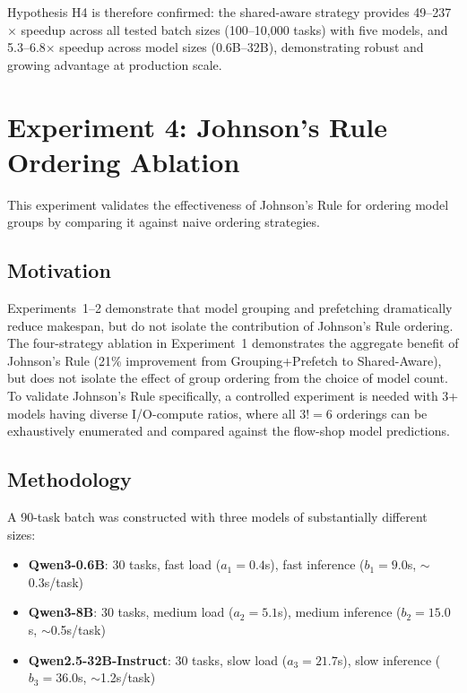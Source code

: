 \documentclass[logo,bsc,singlespacing,parskip,online]{infthesis}
\begin{document}
Hypothesis H4 is therefore confirmed: the shared-aware strategy provides 49--237$\times$ speedup across all tested batch sizes (100--10,000 tasks) with five models, and 5.3--6.8$\times$ speedup across model sizes (0.6B--32B), demonstrating robust and growing advantage at production scale.

\section{Experiment 4: Johnson's Rule Ordering Ablation}

This experiment validates the effectiveness of Johnson's Rule for ordering model groups by comparing it against naive ordering strategies.

\subsection{Motivation}

Experiments~1--2 demonstrate that model grouping and prefetching dramatically reduce makespan, but do not isolate the contribution of Johnson's Rule ordering. The four-strategy ablation in Experiment~1 demonstrates the aggregate benefit of Johnson's Rule (21\% improvement from Grouping+Prefetch to Shared-Aware), but does not isolate the effect of group ordering from the choice of model count. To validate Johnson's Rule specifically, a controlled experiment is needed with 3+ models having diverse I/O-compute ratios, where all $3! = 6$ orderings can be exhaustively enumerated and compared against the flow-shop model predictions.

\subsection{Methodology}

A 90-task batch was constructed with three models of substantially different sizes:
\begin{itemize}
\item \textbf{Qwen3-0.6B}: 30 tasks, fast load ($a_1 = 0.4$s), fast inference ($b_1 = 9.0$s, $\sim$0.3s/task)
\item \textbf{Qwen3-8B}: 30 tasks, medium load ($a_2 = 5.1$s), medium inference ($b_2 = 15.0$s, $\sim$0.5s/task)
\item \textbf{Qwen2.5-32B-Instruct}: 30 tasks, slow load ($a_3 = 21.7$s), slow inference ($b_3 = 36.0$s, $\sim$1.2s/task)
\end{itemize}
\end{document}
